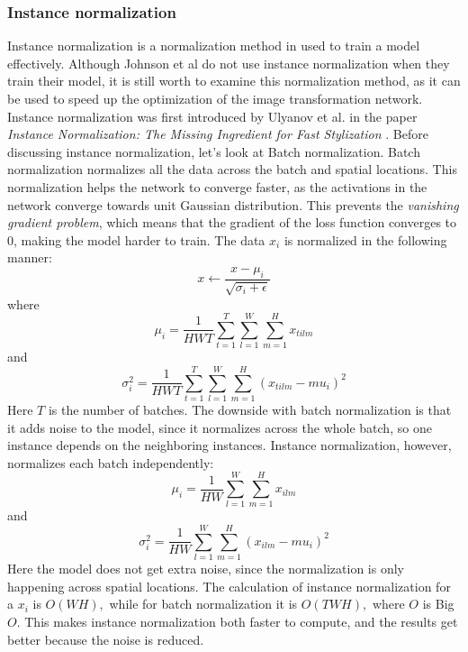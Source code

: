\subsubsection{Instance normalization}
\label{sec:instance_normalization}
Instance normalization is a normalization method in used to train a model effectively. Although Johnson et al do not use instance normalization when they train their model, it is still worth to examine this normalization method, as it can be used to speed up the optimization of the image transformation network. Instance normalization was first introduced by Ulyanov et al. in the paper \textit{Instance Normalization: The Missing Ingredient for Fast Stylization} \cite{Ulyanov:1}.\newline\newline
Before discussing instance normalization, let's look at Batch normalization. Batch normalization normalizes all the data across the batch and spatial locations. This normalization helps the network to converge faster, as the activations in the network converge towards unit Gaussian distribution. This prevents the \textit{vanishing gradient problem}, which means that the gradient of the loss function converges to $0$, making the model harder to train. The data $x_i$ is normalized in the following manner:
\begin{equation}
    x\leftarrow\frac{x-\mu_i}{\sqrt{\sigma_i+\epsilon}}
\end{equation}
where
\begin{equation}
\mu_i=\frac{1}{HWT}\sum_{t=1}^T\sum_{l=1}^W\sum_{m=1}^H{x_{tilm}}
\end{equation}
and
\begin{equation}
\sigma_i^2=\frac{1}{HWT}\sum_{t=1}^T\sum_{l=1}^W\sum_{m=1}^H{(x_{tilm}-mu_i)^2}
\end{equation}
Here $T$ is the number of batches. The downside with batch normalization is that it adds noise to the model, since it normalizes across the whole batch, so one instance depends on the neighboring instances.\newline\newline
Instance normalization, however, normalizes each batch independently:
\begin{equation}
\mu_i=\frac{1}{HW}\sum_{l=1}^W\sum_{m=1}^H{x_{ilm}}
\end{equation}
and
\begin{equation}
\sigma_i^2=\frac{1}{HW}\sum_{l=1}^W\sum_{m=1}^H{(x_{ilm}-mu_i)^2}
\end{equation}
Here the model does not get extra noise, since the normalization is only happening across spatial locations. The calculation of instance normalization for a $x_i$ is $O(WH),$ while for batch normalization it is $O(TWH),$ where $O$ is Big $O$. This makes instance normalization both faster to compute, and the results get better because the noise is reduced.